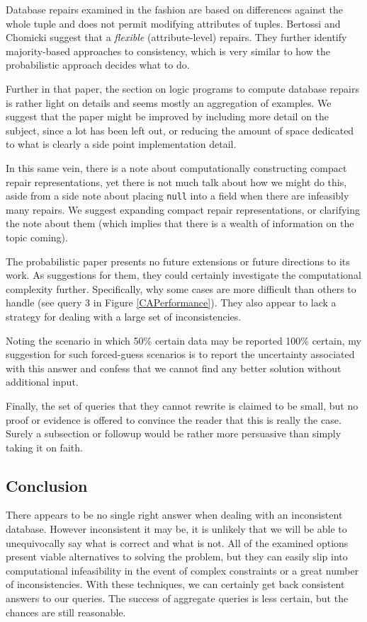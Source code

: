 Database repairs examined in the \cite{CQ} fashion are based on differences against the whole tuple and does not permit modifying attributes of tuples. Bertossi and Chomicki suggest that a \textit{flexible} (attribute-level) repairs. They further identify majority-based approaches to consistency, which is very similar to how the probabilistic approach decides what to do.

Further in that paper, the section on logic programs to compute database repairs is rather light on details and seems mostly an aggregation of examples. We suggest that the paper might be improved by including more detail on the subject, since a lot has been left out, or reducing the amount of space dedicated to what is clearly a side point implementation detail. 

In this same vein, there is a note about computationally constructing compact repair representations, yet there is not much talk about how we might do this, aside from a side note about placing \texttt{null} into a field when there are infeasibly many repairs. We suggest expanding compact repair representations, or clarifying the note about them (which implies that there is a wealth of information on the topic coming).

The probabilistic paper presents no future extensions or future directions to its work. As suggestions for them, they could certainly investigate the computational complexity further. Specifically, why some cases are more difficult than others to handle (see query 3 in Figure \ref{CAPerformance}). They also appear to lack a strategy for dealing with a large set of inconsistencies. 

Noting the scenario in which 50\% certain data may be reported 100\% certain, my suggestion for such forced-guess scenarios is to report the uncertainty associated with this answer and confess that we cannot find any better solution without additional input.

Finally, the set of queries that they cannot rewrite is claimed to be small, but no proof or evidence is offered to convince the reader that this is really the case. Surely a subsection or followup would be rather more persuasive than simply taking it on faith.

\subsection*{Conclusion}

There appears to be no single right answer when dealing with an inconsistent database. However inconsistent it may be, it is unlikely that we will be able to unequivocally say what is correct and what is not. All of the examined options present viable alternatives to solving the problem, but they can easily slip into computational infeasibility in the event of complex constraints or a great number of inconsistencies. With these techniques, we can certainly get back consistent answers to our queries. The success of aggregate queries is less certain, but the chances are still reasonable.

